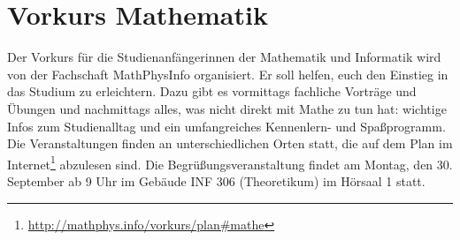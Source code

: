 \section{Vorkurs Mathematik}
Der Vorkurs für die Studienanfängerinnen der Mathematik und Informatik wird von der Fachschaft MathPhysInfo organisiert. Er soll helfen, euch den Einstieg in das Studium zu erleichtern. Dazu gibt es vormittags fachliche Vorträge und Übungen und nachmittags alles, was nicht direkt mit Mathe zu tun hat: wichtige Infos zum Studienalltag und ein umfangreiches Kennenlern- und Spaßprogramm.
Die Veranstaltungen finden an unterschiedlichen Orten statt, die auf dem Plan im Internet\footnote{\url{http://mathphys.info/vorkurs/plan\#mathe}} abzulesen sind. Die Begrüßungsveranstaltung findet am Montag, den 30. September ab 9 Uhr im Gebäude \gls{INF} 306 (Theoretikum) im Hörsaal 1 statt.
